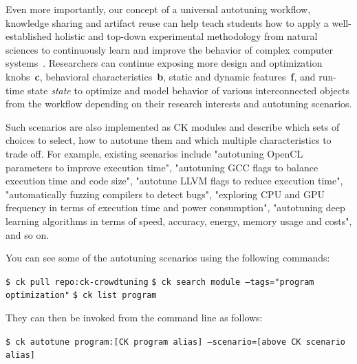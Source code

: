 Even more importantly, our concept of a universal autotuning workflow,
knowledge sharing and artifact reuse can help teach students
how to apply a well-established holistic and top-down
experimental methodology from natural sciences to continuously 
learn and improve the behavior of complex computer systems~\cite{ck-date16,fursin:hal-01054763}.
%
Researchers can continue exposing more design and optimization knobs~\textbf{c},
behavioral characteristics~\textbf{b}, static and dynamic features~\textbf{f},
and run-time state \textit{state} to optimize and model behavior
of various interconnected objects from the workflow depending on their
research interests and autotuning scenarios.

Such scenarios are also implemented as CK modules
and describe which sets of choices to select, 
how to autotune them and which multiple characteristics to trade off.
%
For example, existing scenarios include
"autotuning OpenCL parameters to improve execution time",
"autotuning GCC flags to balance execution time and code size",
"autotune LLVM flags to reduce execution time",
"automatically fuzzing compilers to detect bugs",
"exploring CPU and GPU frequency in terms of execution time and power consumption",
"autotuning deep learning algorithms in terms of speed, accuracy, energy, memory usage and costs",
and so on.

You can see some of the autotuning scenarios using the following commands:\newline
\begin{flushleft}
\texttt{\$ ck pull repo:ck-crowdtuning}\newline
\texttt{\$ ck search module --tags="program optimization"}\newline
\texttt{\$ ck list program}\newline
\end{flushleft}
%
They can then be invoked from the command line as follows:\newline
\begin{flushleft}
\texttt{\$ ck autotune program:[CK program alias] --scenario=[above CK scenario alias]}
\end{flushleft}
